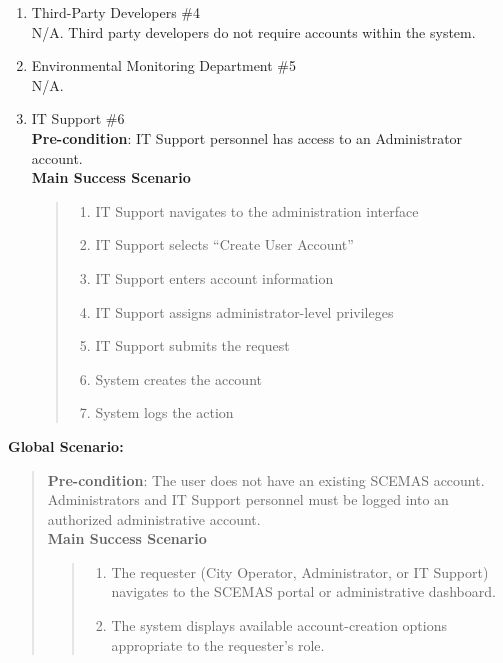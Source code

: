 \documentclass[]{article}
\begin{document}
\begin{enumerate}[{\bf BE9.}]
\begin{enumerate}[{\bf VP1.}]
			\item Third-Party Developers \#4\\
                N/A. Third party developers do not require accounts within the system.

			\item Environmental Monitoring Department \#5\\
                N/A.

			\item IT Support \#6\\
                \textbf{Pre-condition}: IT Support personnel has access to an Administrator account. \\
                \textbf{Main Success Scenario}
                \begin{quote}
                    \begin{enumerate}[1.]
                        \item IT Support navigates to the administration interface
                        \item IT Support selects ``Create User Account''
                        \item IT Support enters account information
                        \item IT Support assigns administrator-level privileges
                        \item IT Support submits the request
                        \item System creates the account
                        \item System logs the action
                    \end{enumerate}
                \end{quote}
		\end{enumerate}
    {\bf Global Scenario:}
        \begin{quote}
            \textbf{Pre-condition}: The user does not have an existing SCEMAS account. Administrators and IT Support personnel must be logged into an authorized administrative account. \\
            \textbf{Main Success Scenario}
            \begin{quote}
                \begin{enumerate}[1.]
                    \item The requester (City Operator, Administrator, or IT Support) navigates to the SCEMAS portal or administrative dashboard.
					\item The system displays available account-creation options appropriate to the requester's role.

\end{enumerate}
\end{quote}
\end{quote}
\end{enumerate}
\end{document}
